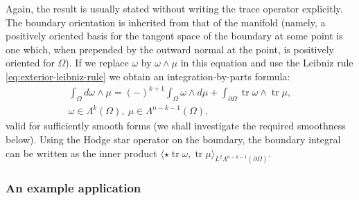 {Again, the result is usually stated without writing the trace operator explicitly. The boundary orientation is inherited from that of the manifold (namely, a positively oriented basis for the tangent space of the boundary at some point is one which, when prepended by the outward normal at the point, is positively oriented for $\Omega$).}
{If we replace $\omega$ by $\omega\wedge\mu$ in this equation and use the Leibniz rule \eqref{eq:exterior-leibniz-rule} we obtain an integration-by-parts formula:}
\begin{equation}\label{eq:differential-forms-integration-by-parts}
\begin{gathered}
\int_\Omega d\omega\wedge\mu=(-)^{k+1}\int_\Omega\omega\wedge d\mu+\int_{\partial\Omega}\operatorname{tr}\omega\wedge\operatorname{tr}\mu,\\
\omega\in\Lambda^k(\Omega),\ \mu\in\Lambda^{n-k-1}(\Omega),
\end{gathered}
\end{equation}
{valid for sufficiently smooth forms (we shall investigate the required smoothness below). Using the Hodge star operator on the boundary, the boundary integral can be written as the inner product $\langle\star\operatorname{tr}\omega,\operatorname{tr}\mu\rangle_{L^2\Lambda^{n-k-1}(\partial\Omega)}$.}

\subsubsection{{An example application}}\label{subsec:piola-application}

